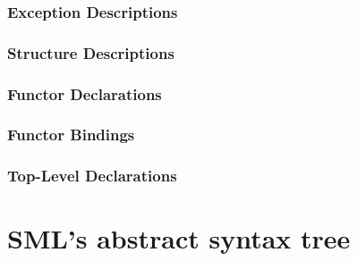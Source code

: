 \documentclass[a4paper,11pt]{article}
\newtheorem{theorem}{Theorem}
\newcommand{\gr}[1]{\todo[linecolor=Plum,backgroundcolor=Plum!25,bordercolor=Plum]{G: #1}}
\newcommand\stog{\boldsymbol{\Longrightarrow}}
\begin{document}
\subsubsection{Exception Descriptions}

\subsubsection{Structure Descriptions}

\subsubsection{Functor Declarations}

\subsubsection{Functor Bindings}

\subsubsection{Top-Level Declarations}


%  
%  
%  
%  
%  

\appendix

\section{SML's abstract syntax tree}
\end{document}
